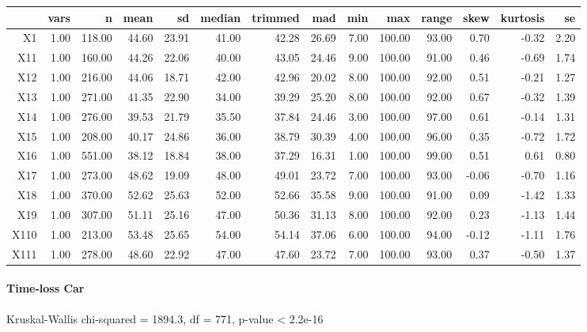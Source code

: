 \begin{tabular}{rrrrrrrrrrrrrr}
  \hline
 & vars & n & mean & sd & median & trimmed & mad & min & max & range & skew & kurtosis & se \\ 
  \hline
X1 & 1.00 & 118.00 & 44.60 & 23.91 & 41.00 & 42.28 & 26.69 & 7.00 & 100.00 & 93.00 & 0.70 & -0.32 & 2.20 \\ 
  X11 & 1.00 & 160.00 & 44.26 & 22.06 & 40.00 & 43.05 & 24.46 & 9.00 & 100.00 & 91.00 & 0.46 & -0.69 & 1.74 \\ 
  X12 & 1.00 & 216.00 & 44.06 & 18.71 & 42.00 & 42.96 & 20.02 & 8.00 & 100.00 & 92.00 & 0.51 & -0.21 & 1.27 \\ 
  X13 & 1.00 & 271.00 & 41.35 & 22.90 & 34.00 & 39.29 & 25.20 & 8.00 & 100.00 & 92.00 & 0.67 & -0.32 & 1.39 \\ 
  X14 & 1.00 & 276.00 & 39.53 & 21.79 & 35.50 & 37.84 & 24.46 & 3.00 & 100.00 & 97.00 & 0.61 & -0.14 & 1.31 \\ 
  X15 & 1.00 & 208.00 & 40.17 & 24.86 & 36.00 & 38.79 & 30.39 & 4.00 & 100.00 & 96.00 & 0.35 & -0.72 & 1.72 \\ 
  X16 & 1.00 & 551.00 & 38.12 & 18.84 & 38.00 & 37.29 & 16.31 & 1.00 & 100.00 & 99.00 & 0.51 & 0.61 & 0.80 \\ 
  X17 & 1.00 & 273.00 & 48.62 & 19.09 & 48.00 & 49.01 & 23.72 & 7.00 & 100.00 & 93.00 & -0.06 & -0.70 & 1.16 \\ 
  X18 & 1.00 & 370.00 & 52.62 & 25.63 & 52.00 & 52.66 & 35.58 & 9.00 & 100.00 & 91.00 & 0.09 & -1.42 & 1.33 \\ 
  X19 & 1.00 & 307.00 & 51.11 & 25.16 & 47.00 & 50.36 & 31.13 & 8.00 & 100.00 & 92.00 & 0.23 & -1.13 & 1.44 \\ 
  X110 & 1.00 & 213.00 & 53.48 & 25.65 & 54.00 & 54.14 & 37.06 & 6.00 & 100.00 & 94.00 & -0.12 & -1.11 & 1.76 \\ 
  X111 & 1.00 & 278.00 & 48.60 & 22.92 & 47.00 & 47.60 & 23.72 & 7.00 & 100.00 & 93.00 & 0.37 & -0.50 & 1.37 \\ 
   \hline
\end{tabular}

\paragraph{Time-loss Car}
Kruskal-Wallis chi-squared = 1894.3, df = 771, p-value < 2.2e-16

